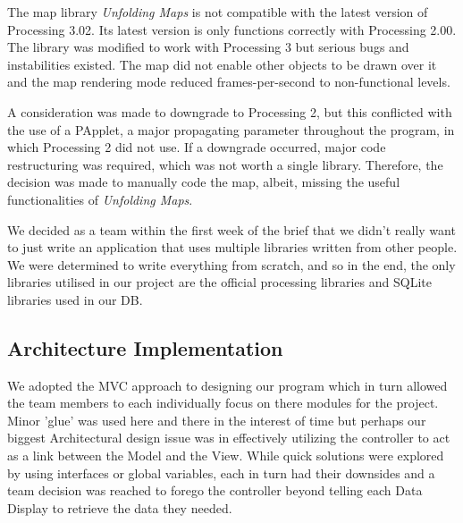 \documentclass[]{article}
\begin{document}
	The map library \textit{Unfolding Maps} is not compatible with the latest version of Processing 3.02. Its latest version is only functions correctly with Processing 2.00. The library was modified to work with Processing 3 but serious bugs and instabilities existed. The map did not enable other objects to be drawn over it and the map rendering mode reduced frames-per-second to non-functional levels.
	
	A consideration was made to downgrade to Processing 2, but this conflicted with the use of a PApplet, a major propagating parameter throughout the program, in which Processing 2 did not use. If a downgrade occurred,  major code restructuring was required, which was not worth a single library. Therefore, the decision was made to manually code the map, albeit, missing the useful functionalities of \textit{Unfolding Maps}.
	
	We decided as a team within the first week of the brief that we didn't really want to just write an application that uses multiple libraries written from other people. We were determined to write everything from scratch, and so in the end, the only libraries utilised in our project are the official processing libraries and SQLite libraries used in our DB.
	
	\subsection{Architecture Implementation}
	
	We adopted the MVC approach to designing our program which in turn allowed the team members to each individually focus on there modules for the project. Minor 'glue' was used here and there in the interest of time but perhaps our biggest Architectural design issue was in effectively utilizing the controller to act as a link between the Model and the View. While quick solutions were explored by using interfaces or global variables, each in turn had their downsides and a team decision was reached to forego the controller beyond telling each Data Display to retrieve the data they needed.
	
\end{document}

